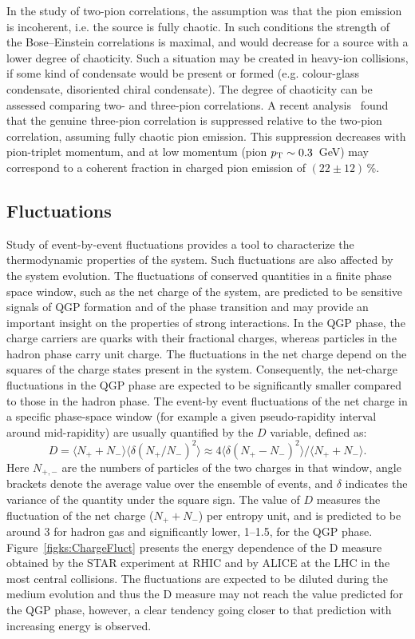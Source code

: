 In the study of two-pion correlations, the assumption was that the pion emission is incoherent, i.e. the source is fully chaotic. In such conditions the strength of the Bose--Einstein correlations is maximal, and would decrease for a source with a lower degree of chaoticity. Such a situation may be created in heavy-ion collisions, if some kind of condensate would be present or formed (e.g. colour-glass condensate, disoriented chiral condensate). The degree of chaoticity can be assessed comparing two- and three-pion correlations. A recent analysis~\cite{} found that the genuine three-pion correlation is suppressed relative to the two-pion correlation, assuming fully chaotic pion emission. This suppression decreases with pion-triplet momentum, and at low momentum (pion $p_{\rm T} \sim 0.3$~GeV) may correspond to a coherent fraction in charged pion emission of $(22 \pm 12)$\,\%.


\subsection{Fluctuations}
\label{subsecks:fluct}
Study of event-by-event fluctuations provides a tool to characterize the thermodynamic properties of the system. Such fluctuations are also affected by the system evolution. The fluctuations of conserved quantities in a finite phase space window, such as the net charge of the system, are predicted to be sensitive signals of QGP formation and of the phase transition and may provide an important insight on the properties of strong interactions. In the QGP phase, the charge carriers are quarks with their fractional charges, whereas particles in the hadron phase carry unit charge. The fluctuations in the net charge depend on the squares of the charge states present in the system. Consequently, the net-charge fluctuations in the QGP phase are expected to be significantly smaller compared to those in the hadron phase. The event-by event fluctuations of the net charge in a specific phase-space window (for example a given pseudo-rapidity interval around mid-rapidity) are usually quantified by the $D$ variable, defined as:
\begin{equation}
D = \langle N_{+} + N_{-} \rangle \langle \delta (N_{+} / N_{-})^2 \rangle \approx 4 \langle \delta (N_{+} - N_{-})^2 \rangle / \langle N_{+} + N_{-} \rangle .
\end{equation}
Here $N_{+,-}$ are the numbers of particles of the two charges in that window, angle brackets denote the average value over the ensemble of events, and $\delta$ indicates the variance of the quantity under the square sign. The value of $D$ measures the fluctuation of the net charge ($N_{+} + N_{-}$) per entropy unit, and is predicted to be around 3 for hadron gas and significantly lower, 1--1.5, for the QGP phase. Figure~\ref{figks:ChargeFluct} presents the energy dependence of the D measure obtained by the STAR experiment at RHIC and by ALICE at the LHC in the most central collisions. The fluctuations are expected to be diluted during the medium evolution and thus the D measure may not reach the value predicted for the QGP phase, however, a clear tendency going closer to that prediction with increasing energy is observed.

